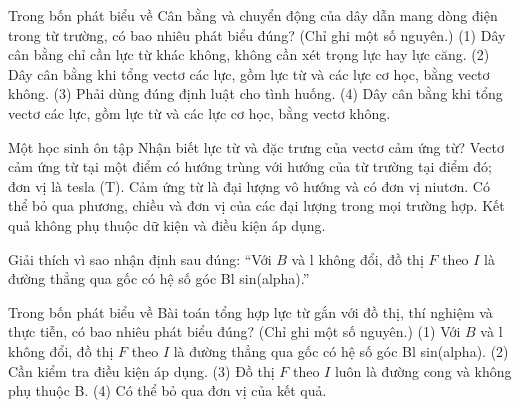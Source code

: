 \begin{ex}
Trong bốn phát biểu về Cân bằng và chuyển động của dây dẫn mang dòng điện trong từ trường, có bao nhiêu phát biểu đúng? (Chỉ ghi một số nguyên.) (1) Dây cân bằng chỉ cần lực từ khác không, không cần xét trọng lực hay lực căng. (2) Dây cân bằng khi tổng vectơ các lực, gồm lực từ và các lực cơ học, bằng vectơ không. (3) Phải dùng đúng định luật cho tình huống. (4) Dây cân bằng khi tổng vectơ các lực, gồm lực từ và các lực cơ học, bằng vectơ không.
\end{ex}

\begin{ex}
Một học sinh ôn tập Nhận biết lực từ và đặc trưng của vectơ cảm ứng từ?
\choice
{\True Vectơ cảm ứng từ tại một điểm có hướng trùng với hướng của từ trường tại điểm đó; đơn vị là tesla (T).}
{Cảm ứng từ là đại lượng vô hướng và có đơn vị niutơn.}
{Có thể bỏ qua phương, chiều và đơn vị của các đại lượng trong mọi trường hợp.}
{Kết quả không phụ thuộc dữ kiện và điều kiện áp dụng.}
\end{ex}

\begin{bt}
Giải thích vì sao nhận định sau đúng: “Với $B$ và l không đổi, đồ thị $F$ theo $I$ là đường thẳng qua gốc có hệ số góc Bl sin(alpha).”
\end{bt}

\begin{ex}
Trong bốn phát biểu về Bài toán tổng hợp lực từ gắn với đồ thị, thí nghiệm và thực tiễn, có bao nhiêu phát biểu đúng? (Chỉ ghi một số nguyên.) (1) Với $B$ và l không đổi, đồ thị $F$ theo $I$ là đường thẳng qua gốc có hệ số góc Bl sin(alpha). (2) Cần kiểm tra điều kiện áp dụng. (3) Đồ thị $F$ theo $I$ luôn là đường cong và không phụ thuộc B. (4) Có thể bỏ qua đơn vị của kết quả.
\end{ex}

